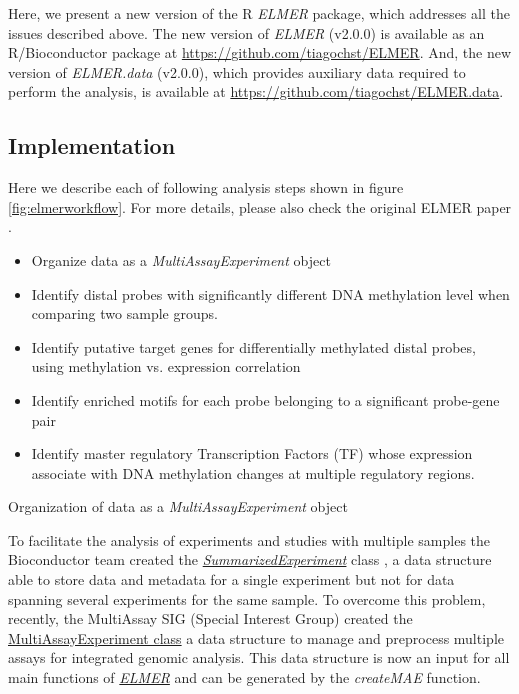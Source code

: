 Here, we present a new version of the R \textit{ELMER} package, which addresses all the issues described above. 
The new version of \textit{ELMER} (v2.0.0) is available as an R/Bioconductor package at \url{https://github.com/tiagochst/ELMER}. And, the new version of \textit{ELMER.data} (v2.0.0), which provides auxiliary data required to perform the analysis, is available at 
\url{https://github.com/tiagochst/ELMER.data}. 

\subsection*{Implementation}
% 
% 
Here we describe each of following analysis steps shown in figure \ref{fig:elmerworkflow}. For more details, please also check the original ELMER paper \cite{yao2015inferring}. 
\begin{itemize}
    \item Organize data as a \textit{MultiAssayExperiment} object
	\item Identify distal probes with significantly different DNA methylation level when comparing two sample groups.
	\item Identify putative target genes for differentially methylated distal probes, using methylation vs. expression correlation
	\item Identify enriched motifs for each probe belonging to a significant probe-gene pair
	\item Identify master regulatory Transcription Factors (TF) whose expression associate with DNA methylation changes at multiple regulatory regions.
\end{itemize}

Organization of data as a \textit{MultiAssayExperiment} object

To facilitate the analysis of experiments and studies with multiple samples the Bioconductor team created the \href{http://bioconductor.org/packages/SummarizedExperiment/}{\textit{SummarizedExperiment}} class \cite{huber2015orchestrating}, a data structure able to store data and metadata for a single experiment but not for data spanning several experiments for the same sample. To overcome this problem, recently, the MultiAssay SIG (Special Interest Group) created the \href{http://bioconductor.org/packages/MultiAssayExperiment/}{MultiAssayExperiment class} \cite{mae2017} a data structure to manage and preprocess multiple assays for integrated genomic analysis. This data structure is now an input for all main functions of \href{https://github.com/tiagochst/ELMER}{\textit{ELMER}} and can be generated by the \textit{createMAE} function. 

